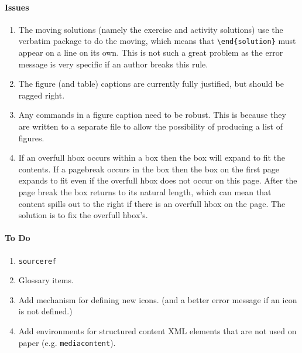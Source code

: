 \documentclass[solutionsatend]{ouunit}
\begin{document}
\paragraph{Issues}
\begin{enumerate}
\item
The moving solutions (namely the exercise and activity solutions) use the verbatim package to do the moving, which means that \verb”\end{solution}” must appear on a line on its own. This is not such a great problem as the error message is very specific if an author breaks this rule.
\item
The figure (and table) captions are currently fully justified, but should be ragged right.
\item
Any commands in a figure caption need to be robust. This is because they are written to a separate file to allow the possibility of producing a list of figures.
\item
If an overfull hbox occurs within a box then the box will expand to fit the contents. If a pagebreak occurs in the box then the box on the first page expands to fit even if the overfull hbox does not occur on this page. After the page break the box returns to its natural length, which can mean that content spills out to the right if there is an overfull hbox on the page. The solution is to fix the overfull hbox's.
\end{enumerate}

\paragraph{To Do}
\begin{enumerate}
\item
\verb”sourceref”
\item
Glossary items.
\item
Add mechanism for defining new icons. (and a better error message if an icon is not defined.)
\item
Add environments for structured content XML elements that are not used on paper (e.g. 
\verb"mediacontent").
\end{enumerate}

\printexercisesolutions
\printactivitysolutions
\printindex
 
\end{document}
